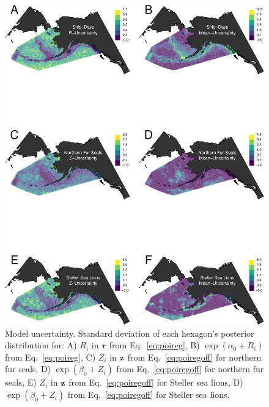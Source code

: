 \documentclass[11pt, titlepage]{article}
\begin{document}
\begin{spacing}{1.9}
\begin{flushleft}
\begin{figure}[H]
  \begin{center}
  \includegraphics[width=.8\linewidth]{figures/Fig-Uncertainty-crop}
  \end{center}
  \caption{Model uncertainty. Standard deviation of each hexagon's posterior distribution  for: A) $R_{i}$ in $\mathbf{r}$ from Eq.~\eqref{eq:poireg}, B) $\exp(\alpha_{0} + R_{i})$ from Eq.~\eqref{eq:poireg}, C) $Z_{i}$ in $\mathbf{z}$ from Eq.~\eqref{eq:poiregoff} for northern fur seals, D) $\exp(\beta_{0} + Z_{i})$ from Eq.~\eqref{eq:poiregoff} for northern fur seals, E) $Z_{i}$ in $\mathbf{z}$ from Eq.~\eqref{eq:poiregoff} for Steller sea lions, D) $\exp(\beta_{0} + Z_{i})$ from Eq.~\eqref{eq:poiregoff} for Steller sea lions.
  \label{Fig-Uncertainty}}         
\end{figure} 


\end{flushleft}
\end{spacing}
\end{document}
